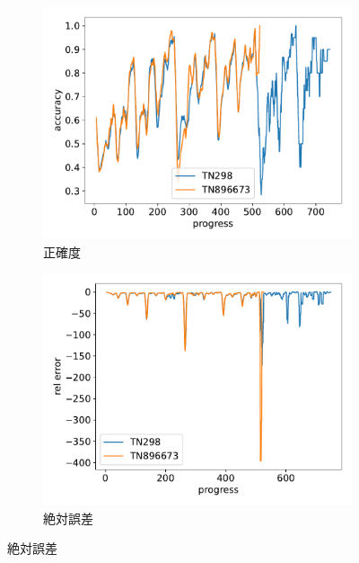 \begin{figure}[t]
\centering
\begin{subfigure}[b]{0.49\linewidth}
    \includegraphics[width=\linewidth]{pdf/compare/merged_EXP_5_NT5_OI1200_compare/accuracy.pdf}
    \caption{正確度}
    \label{fig:nt5_exp5_accuracy}
\end{subfigure}
\begin{subfigure}[b]{0.49\linewidth}
    \includegraphics[width=\linewidth]{pdf/compare/merged_EXP_5_NT5_OI1200_compare/error_abs.pdf}
    \caption{絶対誤差}
    \label{fig:nt5_exp5_error_abs}
\end{subfigure}

\end{figure}
